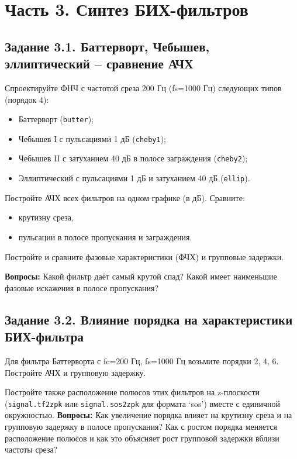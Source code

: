 \documentclass[12pt,a4paper,openany]{book}
\providecommand{\tightlist}{\setlength{\itemsep}{0pt}\setlength{\parskip}{0pt}}
\begin{document}
\section*{Часть 3. Синтез БИХ-фильтров}

\subsection*{Задание 3.1. Баттерворт, Чебышев, эллиптический -- сравнение АЧХ}

Спроектируйте ФНЧ с частотой среза 200 Гц (fs=1000 Гц) следующих типов (порядок 4):

\begin{itemize}
\tightlist
\item
  Баттерворт (\texttt{butter});
\item
  Чебышев I с пульсациями 1 дБ (\texttt{cheby1});
\item
  Чебышев II с затуханием 40 дБ в полосе заграждения (\texttt{cheby2});
\item
  Эллиптический с пульсациями 1 дБ и затуханием 40 дБ (\texttt{ellip}).
\end{itemize}

Постройте АЧХ всех фильтров на одном графике (в дБ). Сравните:

\begin{itemize}
\tightlist
\item
  крутизну среза,
\item
  пульсации в полосе пропускания и заграждения.
\end{itemize}

Постройте и сравните фазовые характеристики (ФЧХ) и групповые задержки.

\textbf{Вопросы:} Какой фильтр даёт самый крутой спад? Какой имеет наименьшие фазовые искажения в полосе пропускания?

\subsection*{Задание 3.2. Влияние порядка на характеристики БИХ-фильтра}

Для фильтра Баттерворта с fc=200 Гц, fs=1000 Гц возьмите порядки 2, 4, 6. Постройте АЧХ и групповую задержку.

Постройте также расположение полюсов этих фильтров на z-плоскости (\texttt{signal.\allowbreak{}tf2zpk} или \texttt{signal.\allowbreak{}sos2zpk} для формата `sos') вместе с единичной окружностью.
\textbf{Вопросы:} Как увеличение порядка влияет на крутизну среза и на групповую задержку в полосе пропускания? Как с ростом порядка меняется расположение полюсов и как это объясняет рост групповой задержки вблизи частоты среза?
\end{document}

